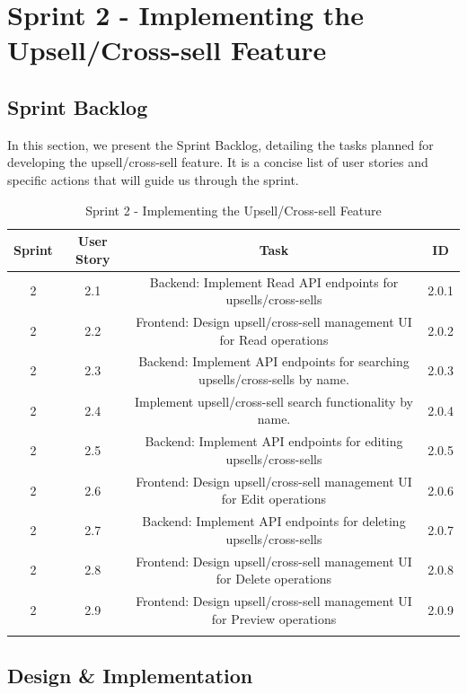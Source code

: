 \section{Sprint 2 - Implementing the Upsell/Cross-sell Feature}

\subsection{Sprint Backlog}

In this section, we present the Sprint Backlog, detailing the tasks planned for developing the upsell/cross-sell feature. It is a concise list of user stories and specific actions that will guide us through the sprint.

\setlength{\LTleft}{0pt}
\begin{longtable}{|c|c|c|c|}
\hline
\textbf{Sprint} & \textbf{User Story} & \textbf{Task} & \textbf{ID} \\
\hline
2 & 2.1 & Backend: Implement Read API endpoints for upsells/cross-sells & 2.0.1 \\
\hline
2 & 2.2 & Frontend: Design upsell/cross-sell management UI for Read operations & 2.0.2 \\
\hline
2 & 2.3 & Backend: Implement API endpoints for searching upsells/cross-sells by name. & 2.0.3 \\
\hline
2 & 2.4 & Implement upsell/cross-sell search functionality by name. & 2.0.4 \\
\hline
2 & 2.5 & Backend: Implement API endpoints for editing upsells/cross-sells & 2.0.5 \\
\hline
2 & 2.6 & Frontend: Design upsell/cross-sell management UI for Edit operations & 2.0.6 \\
\hline
2 & 2.7 & Backend: Implement API endpoints for deleting upsells/cross-sells & 2.0.7 \\
\hline
2 & 2.8 & Frontend: Design upsell/cross-sell management UI for Delete operations & 2.0.8 \\
\hline
2 & 2.9 & Frontend: Design upsell/cross-sell management UI for Preview operations & 2.0.9 \\
\hline
\caption{Sprint 2 - Implementing the Upsell/Cross-sell Feature}
\label{tab:sprint2_backlog}
\end{longtable}

\subsection{Design \& Implementation}

